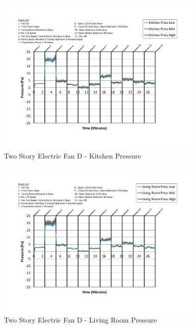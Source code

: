 \documentclass{article}
\begin{document}
\begin{appendices}
	\begin{figure}[H]
		\centering
		\includegraphics[height=3.05in,trim=0.67in 1.1in 0.67in 0.8in,clip=true]{0_Images/Results_Charts/ColdFlow/Two_Story/Electric/D/Kitchen_Pressure.pdf}
		\caption{Two Story Electric Fan D - Kitchen Pressure}
	\end{figure}
 

	\begin{figure}[H]
		\centering
		\includegraphics[height=3.05in,trim=0.67in 1.1in 0.67in 0.8in,clip=true]{0_Images/Results_Charts/ColdFlow/Two_Story/Electric/D/Living_Room_Pressure.pdf}
		\caption{Two Story Electric Fan D - Living Room Pressure}
	\end{figure}
 
	\clearpage


\end{appendices}
\end{document}
